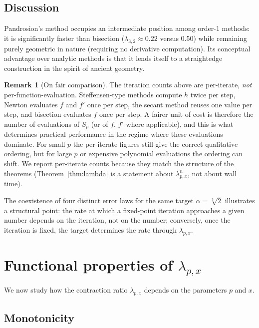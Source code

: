 \documentclass[11pt,a4paper]{article}
\theoremstyle{definition}
\newtheorem{remark}{Remark}[section]
\newcommand{\cbrt}[1]{\sqrt[3]{#1}}
\begin{document}
\subsection{Discussion}

Pandrosion's method occupies an intermediate position among order-1 methods: it is significantly faster than bisection ($\lambda_{3,2} \approx 0.22$ versus $0.50$) while remaining purely geometric in nature (requiring no derivative computation).  Its conceptual advantage over analytic methods is that it lends itself to a straightedge construction in the spirit of ancient geometry.

\begin{remark}[On fair comparison]
\label{rem:fair-comparison}
The iteration counts above are per-iterate, \emph{not} per-function-evaluation. Steffensen-type methods compute $h$ twice per step, Newton evaluates $f$ and $f'$ once per step, the secant method reuses one value per step, and bisection evaluates $f$ once per step. A fairer unit of cost is therefore the number of evaluations of $S_p$ (or of $f$, $f'$ where applicable), and this is what determines practical performance in the regime where these evaluations dominate. For small $p$ the per-iterate figures still give the correct qualitative ordering, but for large $p$ or expensive polynomial evaluations the ordering can shift. We report per-iterate counts because they match the structure of the theorems (Theorem~\ref{thm:lambda} is a statement about $\lambda_{p,x}^n$, not about wall time).
\end{remark}

The coexistence of four distinct error laws for the same target $\alpha = \cbrt{2}$ illustrates a structural point: the rate at which a fixed-point iteration approaches a given number depends on the iteration, not on the number; conversely, once the iteration is fixed, the target determines the rate through $\lambda_{p,x}$.

\section{Functional properties of \texorpdfstring{$\lambda_{p,x}$}{lambda}}
\label{sec:functional}

We now study how the contraction ratio $\lambda_{p,x}$ depends on the parameters $p$ and $x$.

\subsection{Monotonicity}
\end{document}
